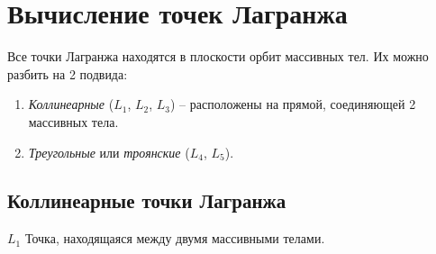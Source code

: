 \documentclass[12pt]{article}
\begin{document}
    \section{Вычисление точек Лагранжа}
    Все точки Лагранжа находятся в плоскости орбит массивных тел. Их можно
    разбить на 2 подвида:
    \begin{enumerate}
        \item \textit{Коллинеарные} ($L_1$, $L_2$, $L_3$) -- расположены на прямой,
        соединяющей 2 массивных тела.
        \item \textit{Треугольные} или \textit{троянские} ($L_4$, $L_5$).
    \end{enumerate}

    \subsection{Коллинеарные точки Лагранжа}
    \par{$L_1$} Точка, находящаяся между двумя массивными телами.
\end{document}
